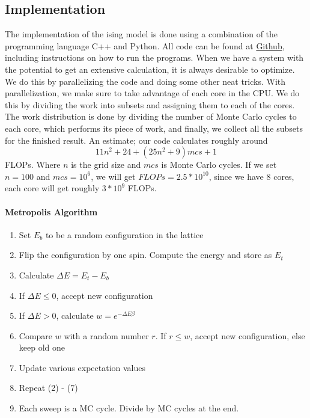 \documentclass{article}
\begin{document}
\subsection{Implementation}
The implementation of the ising model is done using a combination of the programming language C++ and Python. All code can be found at \href{https://github.com/philhoel/Computational-Physics/tree/master/Project4}{Github}, including instructions on how to run the programs.
\newline
\newline
When we have a system with the potential to get an extensive calculation, it is always desirable to optimize. We do this by parallelizing the code and doing some other neat tricks. With parallelization, we make sure to take advantage of each core in the CPU. We do this by dividing the work into subsets and assigning them to each of the cores. The work distribution is done by dividing the number of Monte Carlo cycles to each core, which performs its piece of work, and finally, we collect all the subsets for the finished result. An estimate; our code calculates roughly around
\begin{equation}
    11n^2+24+(25n^2+9)mcs+1
\end{equation}
FLOPs. Where $n$ is the grid size and $mcs$ is Monte Carlo cycles. If we set $n=100$ and $mcs=10^6$, we will get $FLOPs=2.5*10^{10}$, since we have $8$ cores, each core will get roughly $3*10^9$ FLOPs.


\paragraph{Metropolis Algorithm}
\begin{enumerate}
    \item Set $E_b$ to be a random configuration in the lattice
    \item Flip the configuration by one spin. Compute the energy and store as $E_t$
    \item Calculate $\Delta E = E_t - E_b$
    \item If $\Delta E \leq 0$, accept new configuration
    \item If $\Delta E > 0$, calculate $w = e^{-\Delta E \beta}$
    \item Compare $w$ with a random number $r$. If $r \leq w$, accept new configuration, else keep old one
    \item Update various expectation values
    \item Repeat (2) - (7)
    \item Each sweep is a MC cycle. Divide by MC cycles at the end.
\end{enumerate}
\end{document}

